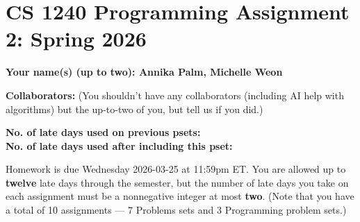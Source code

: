 \documentclass[11pt]{article}
\begin{document}
	
	\section*{CS 1240 Programming Assignment 2: Spring 2026}
 		
	\textbf{Your name(s) (up to two): Annika Palm, Michelle Weon} 
		
	\textbf{Collaborators:} (You shouldn't have any collaborators (including AI help with algorithms) but the up-to-two of you, but tell us if you did.)

	\textbf{No. of late days used on previous psets: }\\ \indent
	\textbf{No. of late days used after including this pset: }

Homework is due Wednesday 2026-03-25 at 11:59pm ET. You are allowed up to {\bf twelve} late days through the semester, but the number of late days you take on each assignment must be a nonnegative integer at most {\bf two}. (Note that you have a total of 10 assignments --- 7 Problems sets and 3 Programming problem sets.)
\end{document}
